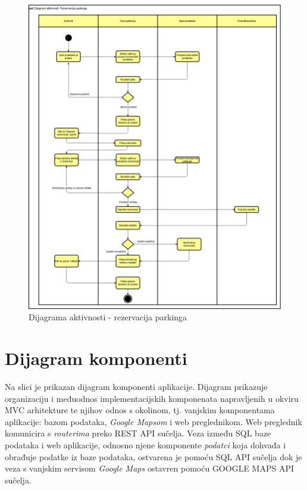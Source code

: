 					\begin{figure}[H]
						\includegraphics[scale=0.35]{dijagrami/dijagram aktivnosti.png} %
						\centering
						\caption{Dijagrama aktivnosti - rezervacija parkinga}
						\label{fig:promjene}
					\end{figure}			
			
			\eject
		\section{Dijagram komponenti}
		
			Na slici je prikazan dijagram komponenti aplikacije. Dijagram prikazuje organizaciju i međuodnos implementacijskih komponenata napravljenih u okviru MVC arhitekture te njihov odnos s okolinom, tj. vanjskim komponentama aplikacije: bazom podataka, \textit{Google Mapsom} i web preglednikom. Web  preglednik komunicira s \textit{routerima} preko REST API  sučelja. Veza između SQL baze podataka i web aplikacije, odnosno njene komponente \textit{podatci} koja dohvađa i obrađuje podatke iz baze podataka, ostvarena je pomoću SQL API sučelja dok je veza s vanjskim servisom \textit{Google Maps} ostavren pomoću GOOGLE MAPS API sučelja.		 
			 
